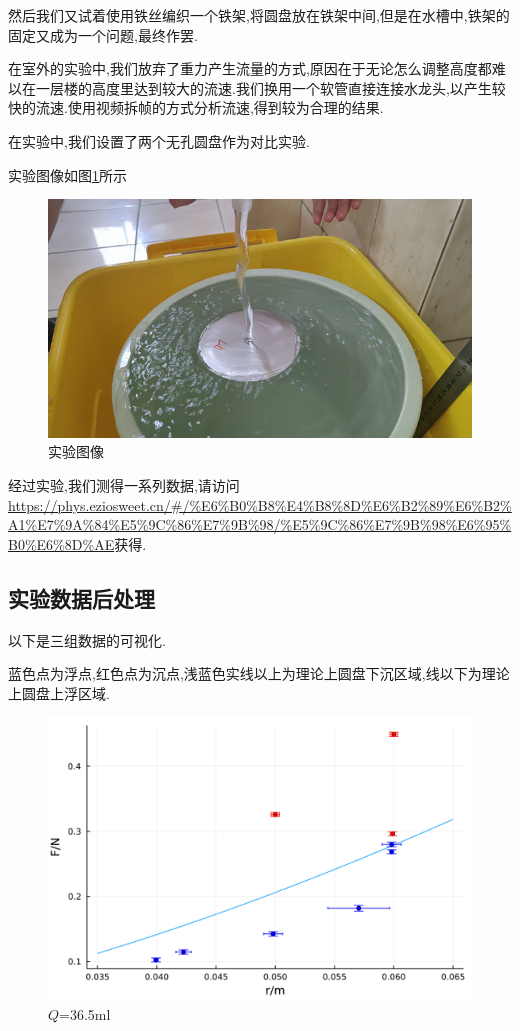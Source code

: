\documentclass[UTF8]{gapd}
\begin{document}
然后我们又试着使用铁丝编织一个铁架,将圆盘放在铁架中间,但是在水槽中,铁架的固定又成为一个问题,最终作罢.

在室外的实验中,我们放弃了重力产生流量的方式,原因在于无论怎么调整高度都难以在一层楼的高度里达到较大的流速.我们换用一个软管直接连接水龙头,以产生较快的流速.使用视频拆帧\cite{gh:SAE}的方式分析流速,得到较为合理的结果.

在实验中,我们设置了两个无孔圆盘作为对比实验.

实验图像如图\ref{fig:unsinkable_disc_experiment}所示
\begin{figure}[!htbp]%
  \centering
  \includegraphics[width=0.8\columnwidth]{images/experiment.png}
  \caption{实验图像}
  \label{fig:unsinkable_disc_experiment}%
\end{figure}

经过实验,我们测得一系列数据,请访问\url{https://phys.eziosweet.cn/#/%E6%B0%B8%E4%B8%8D%E6%B2%89%E6%B2%A1%E7%9A%84%E5%9C%86%E7%9B%98/%E5%9C%86%E7%9B%98%E6%95%B0%E6%8D%AE}获得.

\subsection{实验数据后处理}

以下是三组数据的可视化.

蓝色点为浮点,红色点为沉点,浅蓝色实线以上为理论上圆盘下沉区域,线以下为理论上圆盘上浮区域.
\begin{figure}[!htbp]%
  \centering
  \includegraphics[width=0.8\columnwidth]{images/36.5.png}
  \caption{$Q$=36.5ml}
  \label{fig:unsinkable_disc_36.5}%
\end{figure}
\end{document}
